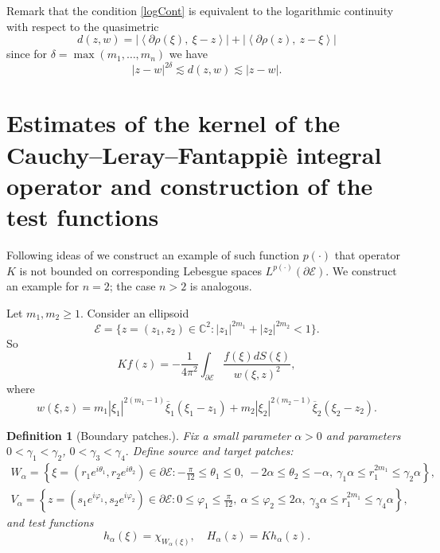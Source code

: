 \documentclass[review]{elsarticle}
\newtheorem{defn}[thm]{Definition}
\newcommand{\abs}[1]{\left\vert #1 \right\vert}
\newcommand{\scp}[2]{ \left\langle #1,\ #2  \right\rangle }
\newcommand{\C}{\mathbb{C}}
\newcommand{\Lp} { L^{p(\cdot)}(\partial\mathcal{E})}
\begin{document}
Remark that the condition \ref{logCont} is equivalent to the logarithmic continuity with respect to the quasimetric 
$$d(z,w) = \abs{\scp{\partial\rho(\xi)}{\xi-z}} + \abs{ \scp{\partial\rho(z)}{z-\xi} }  $$
since for $\delta = \max(m_1,\ldots,m_n)$ we have
$$ \abs{z-w}^{2\delta} \lesssim d(z,w) \lesssim \abs{z-w}.$$




\section{Estimates of the kernel of the Cauchy--Leray--Fantappi\`{e} integral operator and construction of the test functions}

Following ideas of \cite{R17} we construct an example of
such function $p(\cdot)$ that operator $K$ is not bounded on
corresponding Lebesgue spaces $\Lp$. We construct an example for $n=2$;
the case $n>2$ is analogous. 

Let $m_1,m_2\geq 1.$ Consider an ellipsoid 
$$\mathcal{E} = \{z=(z_1,z_2)\in\C^2: \abs{z_1}^{2m_1}+\abs{z_2}^{2m_2} <1\}.$$
So 
\begin{equation*}%
	Kf(z) = -\frac{1}{ 4\pi^2 } \int_{\partial\mathcal{E}} \frac{f(\xi) dS(\xi)}{w(\xi,z)^2},
\end{equation*}
where
\begin{equation*}
	w(\xi,z) = m_1 \abs{\xi_1}^{2(m_1-1)} \overline{\xi}_1 (\xi_1-z_1) + m_2 \abs{\xi_2}^{2(m_2-1)} \overline{\xi}_2 (\xi_2-z_2).
\end{equation*}

\begin{defn}[Boundary patches.]
	 Fix a small parameter $\alpha>0$ and parameters $0<\gamma_1<\gamma_2$, $0<\gamma_3<\gamma_4.$ Define source and target patches:
	 \begin{eqnarray}
	 	W_\alpha  =\left\{\xi=\left(r_1 e^{i \theta_1}, r_2 e^{i \theta_2}\right) \in \partial \mathcal{E}: -\frac{\pi}{12}\leq\theta_1\leq 0,\ -2\alpha\leq\theta_2 \leq -  \alpha,\ \gamma_1\alpha \leq r_1^{2m_1} \leq \gamma_2\alpha\right\}, \\
	 	V_\alpha  =\left\{z=\left(s_1 e^{i \varphi_1}, s_2 e^{i \varphi_2}\right) \in \partial \mathcal{E}: 0\leq\varphi_1\leq \frac{\pi}{12},\ \alpha\leq\varphi_2 \leq 2  \alpha,\  \gamma_3\alpha \leq r_1^{2m_1} \leq \gamma_4\alpha\right\},
	 \end{eqnarray}
	 and test functions 
	 $$h_\alpha(\xi) = \chi_{W_\alpha(\xi)},\quad H_\alpha(z) = Kh_\alpha(z).$$
\end{defn}
\end{document}

